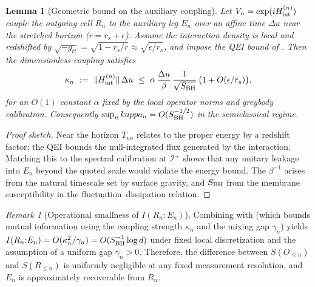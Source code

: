 \documentclass[11pt,a4paper]{article}
\theoremstyle{plain}
\newtheorem{lemma}[theorem]{Lemma}
\theoremstyle{definition}
\theoremstyle{remark}
\newtheorem{remark}[theorem]{Remark}
\begin{document}

\begin{lemma}[Geometric bound on the auxiliary coupling]\label{lem:kappa-geom}
Let $V_n=\exp(i H^{(n)}_{\rm int})$ couple the outgoing cell $R_n$ to the auxiliary leg $E_n$ over an affine time $\Delta u$ near the stretched horizon ($r=r_s+\epsilon$).
Assume the interaction density is local and redshifted by $\sqrt{-g_{tt}}=\sqrt{1-r_s/r}\approx \sqrt{\epsilon/r_s}$, and impose the QEI bound of .
Then the dimensionless coupling satisfies
\[
\kappa_n\ :=\ \|H^{(n)}_{\rm int}\|\,\Delta u\ \le\ \alpha\,\frac{\Delta u}{\beta}\,\frac{1}{\sqrt{S_{\rm BH}}}\,\big(1+O(\epsilon/r_s)\big),
\]
for an $O(1)$ constant $\alpha$ fixed by the local operator norms and greybody calibration. Consequently $\sup_n \\kappa_n=O(S_{\rm BH}^{-1/2})$ in the semiclassical regime.
\end{lemma}
\begin{proof}[Proof sketch]
Near the horizon $T_{uu}$ relates to the proper energy by a redshift factor; the QEI bounds the null-integrated flux generated by the interaction.
Matching this to the spectral calibration at $\mathscr{I}^+$ shows that any unitary leakage into $E_n$ beyond the quoted scale would violate the energy bound.
The $\beta^{-1}$ arises from the natural timescale set by surface gravity, and $S_{\rm BH}$ from the membrane susceptibility in the fluctuation--dissipation relation.
\end{proof}

\begin{remark}[Operational smallness of $I(R_n{:}E_n)$]\label{rem:En-small}
Combining  with  (which bounds mutual information using the coupling strength $\kappa_n$ and the mixing gap $\gamma_n$) yields $I(R_n{:}E_n)=O(\kappa_n^2/\gamma_n)=O(S_{\rm BH}^{-1}\log d)$ under fixed local discretization and the assumption of a uniform gap $\gamma_n>0$. Therefore, the difference between $S(O_{\le n})$ and $S(R_{\le n})$ is uniformly negligible at any fixed measurement resolution, and $E_n$ is approximately recoverable from $R_n$.
\end{remark}
\end{document}
